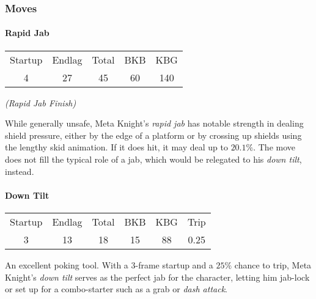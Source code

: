\subsubsection{Moves} \label{ult-metaknight-moves}

\paragraph[Jab]{Rapid Jab}
\begin{center}
	\begin{tabular}{| c  c  c | c  c |}
		\hline
		Startup	& Endlag & Total & BKB & KBG \\
		4	&	27	&	45	&	60	&	140	\\
		\hline
	\end{tabular}
	
	\emph{(Rapid Jab Finish)}
\end{center}

While generally unsafe, Meta Knight's \emph{rapid jab} has notable strength in dealing shield pressure, either by the edge of a platform or by crossing up shields using the lengthy skid animation. If it does hit, it may deal up to $20.1\%$. The move does not fill the typical role of a jab, which would be relegated to his \textit{down tilt}, instead.

\paragraph{Down Tilt}
\begin{center}
	\begin{tabular}{| c  c  c | c  c  c |}
		\hline
		Startup	& Endlag & Total & BKB & KBG & Trip\\
		3	&	13	&	18	&	15	&	88	& 0.25\\
		\hline
	\end{tabular}
\end{center}
An excellent poking tool. With a 3-frame startup and a $25\%$ chance to trip, Meta Knight's \emph{down tilt} serves as the perfect jab for the character, letting him jab-lock or set up for a combo-starter such as a grab or \textit{dash attack}.

